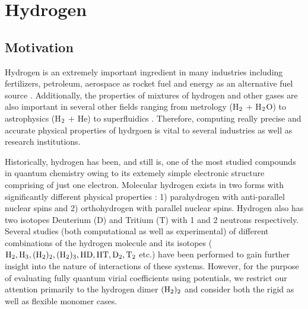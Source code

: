 \chapter{Hydrogen}
    \section{Motivation}
        Hydrogen is an extremely important ingredient in many industries including fertilizers, petroleum, aerospace as rocket fuel and energy as an alternative fuel source \cite{Jacobsen2007}. Additionally, the properties of mixtures of hydrogen and other gases are also important in several other fields ranging from metrology (H$_{\rm 2}$ + H$_{\rm 2}$O) \cite{Hodges2004} to astrophysics (H$_{\rm 2}$ + He) \cite{Boothroyd2002,Boothroyd2003} to superfluidics \cite{Patkowski2008,Grebenev2000}. Therefore, computing really precise and accurate physical properties of hydrgoen is vital to several industries as well as research institutions.

        Historically, hydrogen has been, and still is, one of the most studied compounds in quantum chemistry owing to its extemely simple electronic structure comprising of just one electron. Molecular hydrogen exists in two forms with significantly different physical properties \cite{Jacobsen2007}: 1) parahydrogen with anti-parallel nuclear spins and 2) orthohydrogen with parallel nuclear spins. Hydrogen also has two isotopes Deuterium (D) and Tritium (T) with 1 and 2 neutrons respectively. Several studies \cite{Goodwin1963,Kolos1986,Schwenke1988,Mielke2002,Manzhos2010,Garberoglio2010,Garberoglio2012,Sakoda2012,Garberoglio2013,Garberoglio2014} (both computational as well as experimental) of different combinations of the hydrogen molecule and its isotopes ($\allowbreak {\rm H_2, H_3, (H_2)_2, (H_2)_3, HD, HT, D_2, T_2}$ etc.) have been performed to gain further insight into the nature of interactions of these systems. However, for the purpose of evaluating fully quantum virial coefficients using \abInitio{} potentials, we restrict our attention primarily to the hydrogen dimer ${\rm (H_2)_2}$ and consider both the rigid as well as flexible monomer cases.


